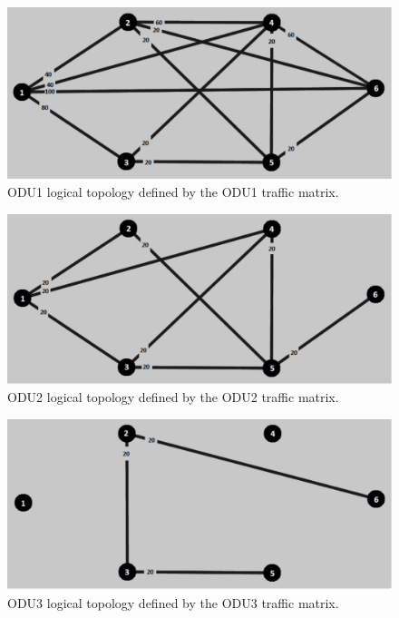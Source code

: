 \begin{figure}[H]
\centering
\includegraphics[width=13cm]{sdf/heuristic/opaque_survivability/figures/logical_topology_odu1_high}
\caption{ODU1 logical topology defined by the ODU1 traffic matrix.}
\label{logical_ODU1_surv_ref_high_heuristic}
\end{figure}

\begin{figure}[H]
\centering
\includegraphics[width=13cm]{sdf/heuristic/opaque_survivability/figures/logical_topology_odu2_high}
\caption{ODU2 logical topology defined by the ODU2 traffic matrix.}
\label{logical_ODU2_surv_ref_high_heuristic}
\end{figure}

\begin{figure}[H]
\centering
\includegraphics[width=13cm]{sdf/heuristic/opaque_survivability/figures/logical_topology_odu3_high}
\caption{ODU3 logical topology defined by the ODU3 traffic matrix.}
\label{logical_ODU3_surv_ref_high_heuristic}
\end{figure}

